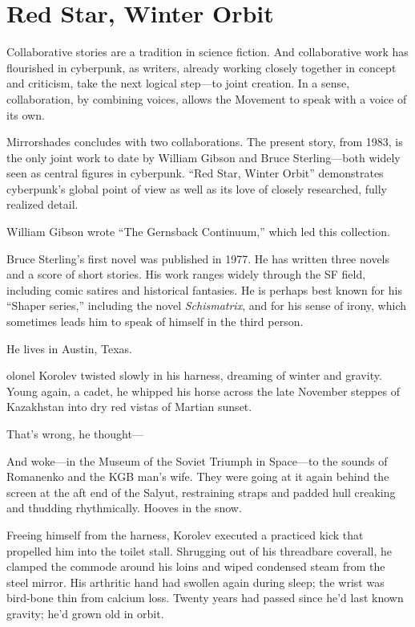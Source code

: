 \chapter{Red Star, Winter Orbit}

Collaborative stories are a tradition in science fiction. And collaborative work has flourished in cyberpunk, as writers, already working closely together in concept and criticism, take the next logical step---to joint creation. In a sense, collaboration, by combining voices, allows the Movement to speak with a voice of its own.

Mirrorshades concludes with two collaborations. The present story, from 1983, is the only joint work to date by William Gibson and Bruce Sterling---both widely seen as central figures in cyberpunk. ``Red Star, Winter Orbit'' demonstrates cyberpunk's global point of view as well as its love of closely researched, fully realized detail.

William Gibson wrote ``The Gernsback Continuum,'' which led this collection.

Bruce Sterling's first novel was published in 1977. He has written three novels and a score of short stories. His work ranges widely through the SF field, including comic satires and historical fantasies. He is perhaps best known for his ``Shaper series,'' including the novel \textit{Schismatrix}, and for his sense of irony, which sometimes leads him to speak of himself in the third person.

He lives in Austin, Texas.

\hrulefill

olonel Korolev twisted slowly in his harness, dreaming of winter and gravity. Young again, a cadet, he whipped his horse across the late November steppes of Kazakhstan into dry red vistas of Martian sunset.

That's wrong, he thought---

And woke---in the Museum of the Soviet Triumph in Space---to the sounds of Romanenko and the KGB man's wife. They were going at it again behind the screen at the aft end of the Salyut, restraining straps and padded hull creaking and thudding rhythmically. Hooves in the snow.

Freeing himself from the harness, Korolev executed a practiced kick that propelled him into the toilet stall. Shrugging out of his threadbare coverall, he clamped the commode around his loins and wiped condensed steam from the steel mirror. His arthritic hand had swollen again during sleep; the wrist was bird-bone thin from calcium loss. Twenty years had passed since he'd last known gravity; he'd grown old in orbit.

